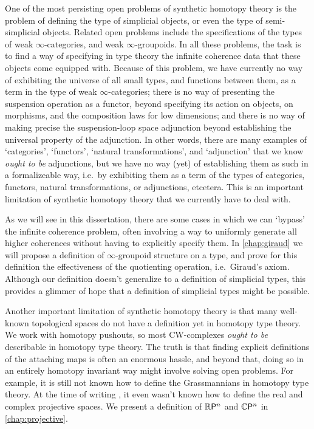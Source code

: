One of the most persisting open problems of synthetic homotopy theory is the problem of defining the type of simplicial objects, or even the type of semi-simplicial objects. Related open problems include the specifications of the types of weak $\infty$-categories, and weak $\infty$-groupoids. In all these problems, the task is to find a way of specifying in type theory the infinite coherence data that these objects come equipped with. Because of this problem, we have currently no way of exhibiting the universe of all small types, and functions between them, as a term in the type of weak $\infty$-categories; there is no way of presenting the suspension operation as a functor, beyond specifying its action on objects, on morphisms, and the composition laws for low dimensions; and there is no way of making precise the suspension-loop space adjunction beyond establishing the universal property of the adjunction. In other words, there are many examples of `categories', `functors', `natural transformations', and `adjunction' that we know \emph{ought to be} adjunctions, but we have no way (yet) of establishing them as such in a formalizeable way, i.e.~by exhibiting them as a term of the types of categories, functors, natural transformations, or adjunctions, etcetera. This is an important limitation of synthetic homotopy theory that we currently have to deal with.

As we will see in this dissertation, there are some cases in which we can `bypass' the infinite coherence problem, often involving a way to uniformly generate all higher coherences without having to explicitly specify them. In \cref{chap:giraud} we will propose a definition of $\infty$-groupoid structure on a type, and prove for this definition the effectiveness of the quotienting operation, i.e.~Giraud's axiom. Although our definition doesn't generalize to a definition of simplicial types, this provides a glimmer of hope that a definition of simplicial types might be possible.

Another important limitation of synthetic homotopy theory is that many well-known topological spaces do not have a definition yet in homotopy type theory. We work with homotopy pushouts, so most CW-complexes \emph{ought to be} describable in homotopy type theory. The truth is that finding explicit definitions of the attaching maps is often an enormous hassle, and beyond that, doing so in an entirely homotopy invariant way might involve solving open problems. For example, it is still not known how to define the Grassmannians in homotopy type theory. At the time of writing \cite{hottbook}, it even wasn't known how to define the real and complex projective spaces. We present a definition of $\mathbb{R}\mathsf{P}^{n}$ and $\mathbb{C}\mathsf{P}^{n}$ in \cref{chap:projective}.

